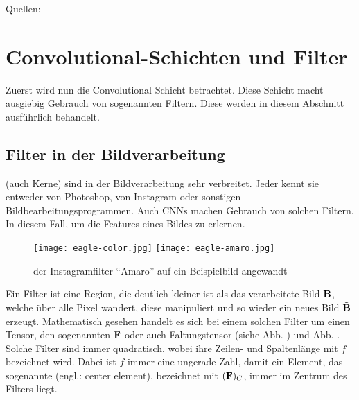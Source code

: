 \para{}
Quellen: \cite{Goodfellow-et-al-2016} \cite{deeplearning.ai:cnn} \cite{wiki:cnn}


\section{Convolutional-Schichten und Filter}
Zuerst wird nun die Convolutional Schicht betrachtet. Diese Schicht macht ausgiebig
Gebrauch von sogenannten Filtern. Diese werden in diesem Abschnitt ausführlich behandelt.

\subsection{Filter in der Bildverarbeitung}
 (auch Kerne) sind in der Bildverarbeitung sehr verbreitet. Jeder kennt sie entweder
von Photoshop, von Instagram oder sonstigen Bildbearbeitungsprogrammen.
Auch CNNs machen Gebrauch von solchen Filtern. In diesem Fall, um die Features eines Bildes zu
erlernen.

\begin{figure}[h!]
  \centering
  \texttt{[image: eagle-color.jpg]}
  \texttt{[image: eagle-amaro.jpg]}
  \caption{der Instagramfilter ``Amaro'' auf ein Beispielbild angewandt \cite{res:eagle_image}}
\end{figure}

\para{}
Ein Filter ist eine Region, die deutlich kleiner ist als das verarbeitete Bild
$\mathbf{B}$, welche über alle Pixel wandert, diese manipuliert und so wieder ein neues Bild
$\tilde{\mathbf{B}}$ erzeugt.
Mathematisch gesehen handelt es sich bei einem solchen Filter um einen Tensor,
den sogenannten  $\mathbf{F}$ oder auch Faltungstensor (siehe Abb.
) und Abb. . Solche Filter sind immer quadratisch, wobei ihre
Zeilen- und Spaltenlänge mit $f$ bezeichnet wird. Dabei ist $f$ immer eine ungerade Zahl, damit ein
Element, das sogenannte  (engl.: center element), bezeichnet mit $(\mathbf{F})_C$,
immer im Zentrum des Filters liegt. \\

